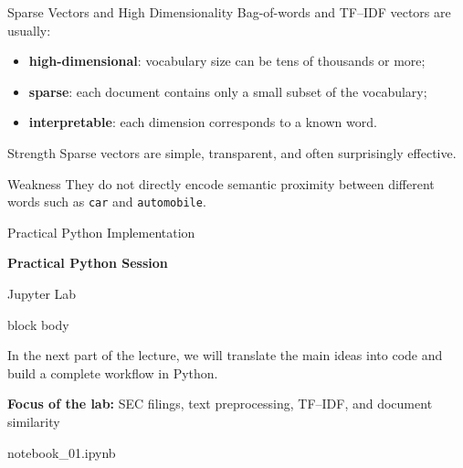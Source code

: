 \documentclass[aspectratio=169]{beamer}
\begin{document}
%
%
\begin{frame}{Sparse Vectors and High Dimensionality}
Bag-of-words and TF--IDF vectors are usually:
\begin{itemize}
    \item \textbf{high-dimensional}: vocabulary size can be tens of thousands or more;
    \item \textbf{sparse}: each document contains only a small subset of the vocabulary;
    \item \textbf{interpretable}: each dimension corresponds to a known word.
\end{itemize}

\vspace{0.15cm}
\begin{block}{Strength}
Sparse vectors are simple, transparent, and often surprisingly effective.
\end{block}

\vspace{0.1cm}
\begin{alertblock}{Weakness}
They do not directly encode semantic proximity between different words such as \texttt{car} and \texttt{automobile}.
\end{alertblock}
\end{frame}
%
%
\begin{frame}{Practical Python Implementation}
\centering
\vspace{1cm}

{\bfseries\LARGE Practical Python Session}

\vspace{0.5cm}

{\large Jupyter Lab}

\vspace{1cm}

\begin{beamercolorbox}[rounded=true, shadow=true, sep=1em, center]{block body}
\begin{minipage}{0.8\textwidth}
\centering
In the next part of the lecture, we will translate the main ideas into code and build a complete workflow in Python.
\end{minipage}
\end{beamercolorbox}

\vspace{0.8cm}

{\normalsize
\textbf{Focus of the lab:} SEC filings, text preprocessing, TF--IDF, and document similarity
}

\vfill

\small 
notebook\_01.ipynb

\end{frame}%
%
\end{document}
